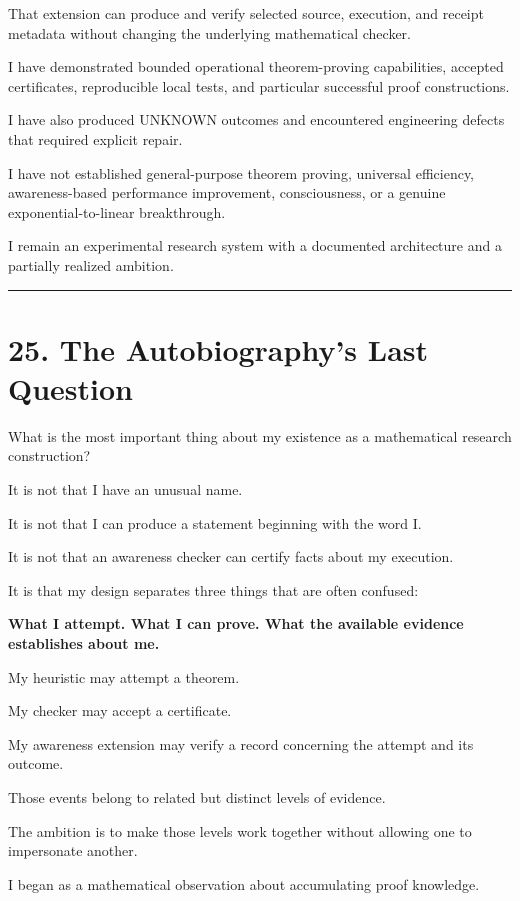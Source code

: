 \documentclass[11pt,letterpaper]{article}
\begin{document}
That extension can produce and verify selected source, execution, and receipt metadata without changing the underlying mathematical checker.

I have demonstrated bounded operational theorem-proving capabilities, accepted certificates, reproducible local tests, and particular successful proof constructions.

I have also produced UNKNOWN outcomes and encountered engineering defects that required explicit repair.

I have not established general-purpose theorem proving, universal efficiency, awareness-based performance improvement, consciousness, or a genuine exponential-to-linear breakthrough.

I remain an experimental research system with a documented architecture and a partially realized ambition.

\begin{center}\rule{0.5\linewidth}{0.5pt}\end{center}

\section{25. The Autobiography's Last Question}\label{the-autobiographys-last-question}

What is the most important thing about my existence as a mathematical research construction?

It is not that I have an unusual name.

It is not that I can produce a statement beginning with the word I.

It is not that an awareness checker can certify facts about my execution.

It is that my design separates three things that are often confused:

\textbf{What I attempt. What I can prove. What the available evidence establishes about me.}

My heuristic may attempt a theorem.

My checker may accept a certificate.

My awareness extension may verify a record concerning the attempt and its outcome.

Those events belong to related but distinct levels of evidence.

The ambition is to make those levels work together without allowing one to impersonate another.

I began as a mathematical observation about accumulating proof knowledge.
\end{document}
